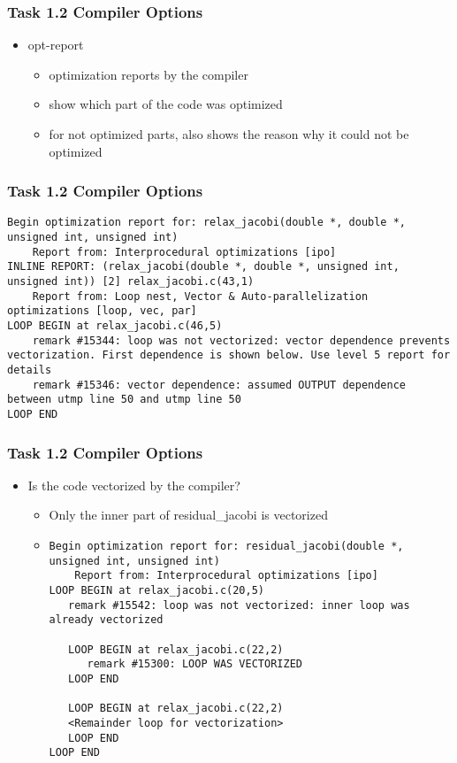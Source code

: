 \begin{frame}
\frametitle{Task 1.2 Compiler Options}
\begin{itemize}
\item opt-report
\begin{itemize}
\item optimization reports by the compiler
\item show which part of the code was optimized
\item for not optimized parts, also shows the reason why it could not be optimized
\end{itemize}
\end{itemize}
\end{frame}

\begin{frame}[fragile]
\frametitle{Task 1.2 Compiler Options}
\begin{lstlisting}
Begin optimization report for: relax_jacobi(double *, double *, unsigned int, unsigned int) 
	Report from: Interprocedural optimizations [ipo] 
INLINE REPORT: (relax_jacobi(double *, double *, unsigned int, unsigned int)) [2] relax_jacobi.c(43,1)
	Report from: Loop nest, Vector & Auto-parallelization optimizations [loop, vec, par]
LOOP BEGIN at relax_jacobi.c(46,5)
	remark #15344: loop was not vectorized: vector dependence prevents vectorization. First dependence is shown below. Use level 5 report for details 
	remark #15346: vector dependence: assumed OUTPUT dependence between utmp line 50 and utmp line 50 
LOOP END
\end{lstlisting}
\end{frame}

\begin{frame}[fragile]
\frametitle{Task 1.2 Compiler Options}
\begin{itemize}
\item Is the code vectorized by the compiler?
\begin{itemize}
\item Only the inner part of residual\_jacobi is vectorized
\item \begin{lstlisting}
Begin optimization report for: residual_jacobi(double *, unsigned int, unsigned int)
    Report from: Interprocedural optimizations [ipo]
LOOP BEGIN at relax_jacobi.c(20,5)
   remark #15542: loop was not vectorized: inner loop was already vectorized

   LOOP BEGIN at relax_jacobi.c(22,2)
      remark #15300: LOOP WAS VECTORIZED
   LOOP END

   LOOP BEGIN at relax_jacobi.c(22,2)
   <Remainder loop for vectorization>
   LOOP END
LOOP END
\end{lstlisting}
\end{itemize}
\end{itemize}
\end{frame}

